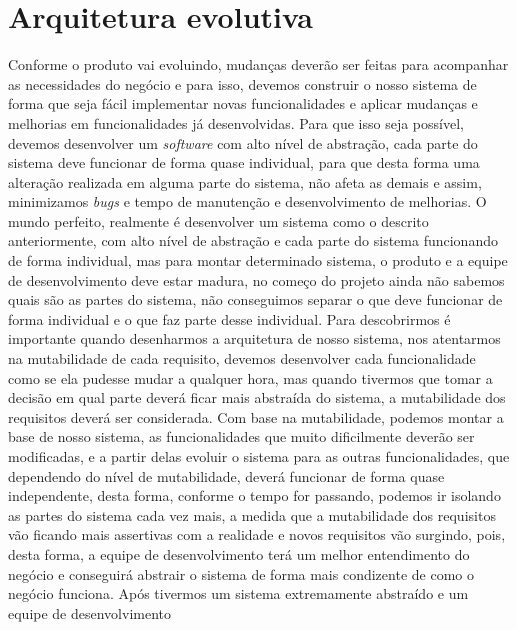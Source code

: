     \section{Arquitetura evolutiva}
      Conforme o produto vai evoluindo, mudanças deverão ser feitas para acompanhar
      as necessidades do negócio e para isso, devemos construir o nosso sistema de
      forma que seja fácil implementar novas funcionalidades e aplicar mudanças e
      melhorias em funcionalidades já desenvolvidas. Para que isso seja possível,
      devemos desenvolver um \textit{software} com alto nível de abstração, cada
      parte do sistema deve funcionar de forma quase individual, para que desta
      forma uma alteração realizada em alguma parte do sistema, não afeta as demais
      e assim, minimizamos \textit{bugs} e tempo de manutenção e desenvolvimento de
      melhorias. \newline
      O mundo perfeito, realmente é desenvolver um sistema como o descrito anteriormente,
      com alto nível de abstração e cada parte do sistema funcionando de forma individual,
      mas para montar determinado sistema, o produto e a equipe
      de desenvolvimento deve estar madura, no começo do projeto ainda não
      sabemos quais são as partes do sistema, não conseguimos separar o que deve
      funcionar de forma individual e o que faz parte desse individual. Para
      descobrirmos é importante quando desenharmos a arquitetura de nosso sistema,
      nos atentarmos na mutabilidade de cada requisito, devemos desenvolver cada
      funcionalidade como se ela pudesse mudar a qualquer hora, mas quando tivermos
      que tomar a decisão em qual parte deverá ficar mais abstraída do sistema,
      a mutabilidade dos requisitos deverá ser considerada. Com base na mutabilidade,
      podemos montar a base de nosso sistema, as funcionalidades que muito dificilmente
      deverão ser modificadas, e a partir delas evoluir o sistema para as outras
      funcionalidades, que dependendo do nível de mutabilidade, deverá funcionar de
      forma quase independente, desta forma, conforme o tempo for passando, podemos
      ir isolando as partes do sistema cada vez mais, a medida que a mutabilidade
      dos requisitos vão ficando mais assertivas com a realidade e novos requisitos
      vão surgindo, pois, desta forma, a equipe de desenvolvimento terá um melhor
      entendimento do negócio e conseguirá abstrair o sistema de forma mais condizente
      de como o negócio funciona. \newline
      Após tivermos um sistema extremamente abstraído e um equipe de desenvolvimento
